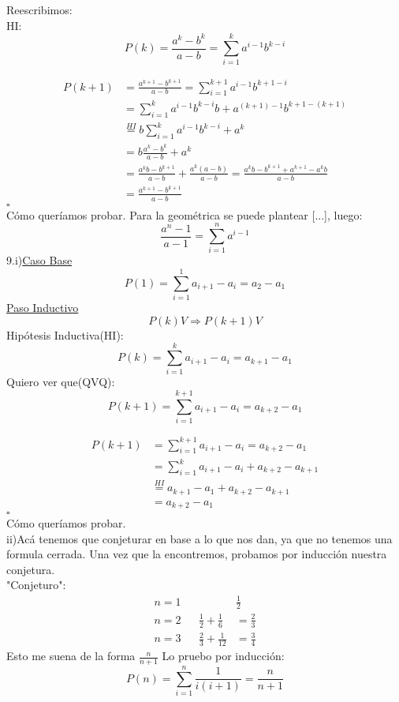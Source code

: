 \documentclass[a4paper,11pt]{article}
\begin{document}
Reescribimos:\\
HI: \[ P(k) = \frac{a^{k} - b^{k}}{a-b} = \sum_{i=1}^{k} a^{i-1}b^{k-i} \]


\begin{equation} 
\begin{split}
P(k+1) & = \frac{a^{k+1} - b^{k+1}}{a-b} = \sum_{i=1}^{k+1}a^{i-1}b^{k+1-i} \\
 &  = \sum_{i=1}^{k}a^{i-1}b^{k-i}b+a^{(k+1)-1}b^{k+1-(k+1)} \\
 & \stackrel{HI}{=} b\sum_{i=1}^{k}a^{i-1}b^{k-i}+a^{k} \\
 & = b \frac{a^{k} - b^{k}}{a-b} +a^{k} \\
 & = \frac{a^{k}b - b^{k+1}}{a-b} +\frac{a^{k}(a-b)}{a-b} = \frac{a^{k}b - b^{k+1}+a^{k+1}-a^{k}b}{a-b} \\
 & = \frac{a^{k+1}- b^{k+1}}{a-b}
\end{split}
\end{equation}
\hfill$\square $\\
Cómo queríamos probar. Para la geométrica se puede plantear [...], luego:\\
 \[ \frac{a^{n} - 1}{a-1} = \sum_{i=1}^{n} a^{i-1} \]
9.i)\underline{Caso Base}\\
\[ P(1) = \sum_{i=1}^{1} a_{i+1}-a_{i} = a_2 - a_1 \]
\underline{Paso Inductivo}\\
\[P(k) V \Rightarrow P(k+1) V\]
Hipótesis Inductiva(HI):\[ P(k) = \sum_{i=1}^{k} a_{i+1}-a_{i} = a_{k+1} - a_1 \]
Quiero ver que(QVQ):\[ P(k+1) = \sum_{i=1}^{k+1} a_{i+1}-a_{i} = a_{k+2} - a_1  \]


\begin{equation}
\begin{split}
P(k+1) & = \sum_{i=1}^{k+1} a_{i+1}-a_{i} = a_{k+2} - a_1 \\
 & = \sum_{i=1}^{k} a_{i+1}-a_{i} + a_{k+2} - a_{k+1}\\
 & \stackrel{HI}{=} a_{k+1} - a_1 + a_{k+2} - a_{k+1} \\
 & = a_{k+2} - a_1
\end{split}
\end{equation}
\hfill$\square $\\
Cómo queríamos probar.\\

ii)Acá tenemos que conjeturar en base a lo que nos dan, ya que no tenemos una formula cerrada. Una vez que la encontremos, probamos por inducción nuestra conjetura.\\
"Conjeturo":\\
\begin{align*}
n=1           &           &  & \frac{1}{2}\\
n=2           &     	  &  \frac{1}{2}+\frac{1}{6}&=\frac{2}{3}\\
n=3           &           &  \frac{2}{3}+\frac{1}{12}&=\frac{3}{4}
\end{align*}
Esto me suena de la forma $\frac{n}{n+1}$ Lo pruebo por inducción:
\[ P(n) = \sum_{i=1}^{n} \frac{1}{i(i+1)} = \frac{n}{n+1} \]
\end{document}
